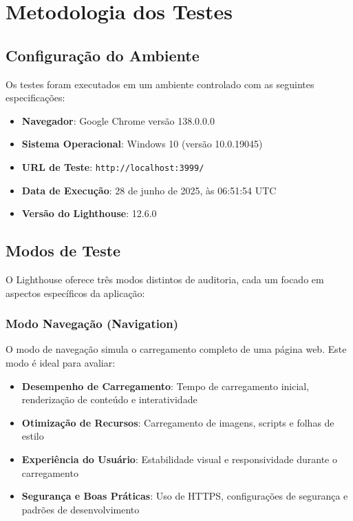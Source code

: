 \section{Metodologia dos Testes}

\subsection{Configuração do Ambiente}

Os testes foram executados em um ambiente controlado com as seguintes especificações:

\begin{itemize}
    \item \textbf{Navegador}: Google Chrome versão 138.0.0.0
    \item \textbf{Sistema Operacional}: Windows 10 (versão 10.0.19045)
    \item \textbf{URL de Teste}: \texttt{http://localhost:3999/}
    \item \textbf{Data de Execução}: 28 de junho de 2025, às 06:51:54 UTC
    \item \textbf{Versão do Lighthouse}: 12.6.0
\end{itemize}

\subsection{Modos de Teste}

O Lighthouse oferece três modos distintos de auditoria, cada um focado em aspectos específicos da aplicação:

\subsubsection{Modo Navegação (Navigation)}

O modo de navegação simula o carregamento completo de uma página web. Este modo é ideal para avaliar:

\begin{itemize}
    \item \textbf{Desempenho de Carregamento}: Tempo de carregamento inicial, renderização de conteúdo e interatividade
    \item \textbf{Otimização de Recursos}: Carregamento de imagens, scripts e folhas de estilo
    \item \textbf{Experiência do Usuário}: Estabilidade visual e responsividade durante o carregamento
    \item \textbf{Segurança e Boas Práticas}: Uso de HTTPS, configurações de segurança e padrões de desenvolvimento
\end{itemize}

